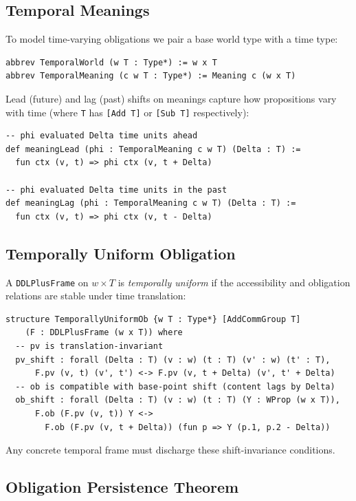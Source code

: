 \documentclass[]{article}
\newcommand{\code}[1]{\texttt{#1}}
\begin{document}
\subsection{Temporal Meanings}

To model time-varying obligations we pair a base world type with a time type:

\begin{lstlisting}
abbrev TemporalWorld (w T : Type*) := w x T
abbrev TemporalMeaning (c w T : Type*) := Meaning c (w x T)
\end{lstlisting}

\noindent
Lead (future) and lag (past) shifts on meanings capture how propositions vary
with time (where \code{T} has \code{[Add T]} or \code{[Sub T]} respectively):

\begin{lstlisting}
-- phi evaluated Delta time units ahead
def meaningLead (phi : TemporalMeaning c w T) (Delta : T) :=
  fun ctx (v, t) => phi ctx (v, t + Delta)

-- phi evaluated Delta time units in the past
def meaningLag (phi : TemporalMeaning c w T) (Delta : T) :=
  fun ctx (v, t) => phi ctx (v, t - Delta)
\end{lstlisting}

\subsection{Temporally Uniform Obligation}

A \code{DDLPlusFrame} on $w \times T$ is \emph{temporally uniform} if the
accessibility and obligation relations are stable under time translation:

\begin{lstlisting}
structure TemporallyUniformOb {w T : Type*} [AddCommGroup T]
    (F : DDLPlusFrame (w x T)) where
  -- pv is translation-invariant
  pv_shift : forall (Delta : T) (v : w) (t : T) (v' : w) (t' : T),
      F.pv (v, t) (v', t') <-> F.pv (v, t + Delta) (v', t' + Delta)
  -- ob is compatible with base-point shift (content lags by Delta)
  ob_shift : forall (Delta : T) (v : w) (t : T) (Y : WProp (w x T)),
      F.ob (F.pv (v, t)) Y <->
        F.ob (F.pv (v, t + Delta)) (fun p => Y (p.1, p.2 - Delta))
\end{lstlisting}

\noindent
Any concrete temporal frame must discharge these shift-invariance conditions.

\subsection{Obligation Persistence Theorem}
\end{document}

